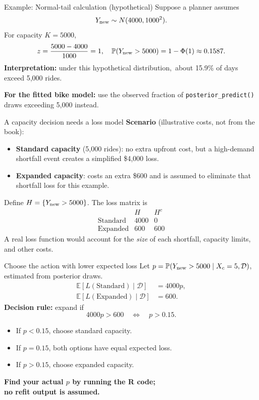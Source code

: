 \documentclass[aspectratio=43,11pt]{beamer}
\newcommand{\E}{\mathbb{E}}
\newcommand{\Prob}{\mathbb{P}}
\newcommand{\dd}{\mathcal D}
\begin{document}
\begin{frame}{Example: Normal-tail calculation (hypothetical)}
\small
Suppose a planner assumes
\[Y_{\rm new}\sim N(4000,1000^2).\]
For capacity $K=5000$,
\[z=\frac{5000-4000}{1000}=1,\quad
\Prob(Y_{\rm new}>5000)=1-\Phi(1)\approx0.1587.\]
\textbf{Interpretation:} under this hypothetical distribution,\
about 15.9\% of days exceed 5,000 rides.
\par\medskip
\textbf{For the fitted bike model:} use the observed fraction of
\texttt{posterior\_predict()} draws exceeding 5,000 instead.
\end{frame}

\begin{frame}{A capacity decision needs a loss model}
\textbf{Scenario} (illustrative costs, not from the book):
\begin{itemize}
\item \textbf{Standard capacity} (5,000 rides): no extra upfront cost, but a high-demand shortfall event creates a simplified \$4,000 loss.
\item \textbf{Expanded capacity}: costs an extra \$600 and is assumed to eliminate that shortfall loss for this example.
\end{itemize}
Define $H=\{Y_{\rm new}>5000\}$. The loss matrix is
\[\begin{array}{c|cc}
& H & H^c\\\hline
\text{Standard} &4000&0\\
\text{Expanded}&600&600
\end{array}\]
\scriptsize A real loss function would account for the \emph{size} of each shortfall, capacity limits, and other costs.
\end{frame}

\begin{frame}{Choose the action with lower expected loss}
Let $p=\Prob(Y_{\rm new}>5000\mid X_c=5,\dd)$, estimated from posterior draws.
\begin{align*}
\E[L(\text{Standard})\mid\dd]&=4000p,\\
\E[L(\text{Expanded})\mid\dd]&=600.
\end{align*}
\textbf{Decision rule:} expand if
\[4000p>600\quad\Longleftrightarrow\quad p>0.15.\]
\begin{itemize}
\item If $p<0.15$, choose standard capacity.
\item If $p=0.15$, both options have equal expected loss.
\item If $p>0.15$, choose expanded capacity.
\end{itemize}
\textbf{Find your actual $p$ by running the R code;\\no refit output is assumed.}
\end{frame}
\end{document}
